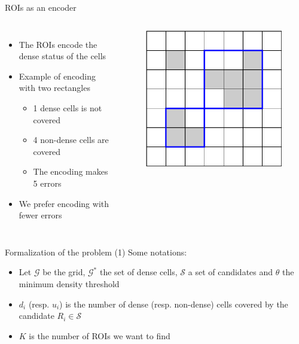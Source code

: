 \documentclass[10pt]{beamer}
\begin{document}
\begin{frame}{ROIs as an encoder}

\begin{columns}[T, onlytextwidth]
    \begin{itemize}
        \item The ROIs encode the dense status of the cells
        \item Example of encoding with two rectangles
        \begin{itemize}
            \item 1 dense cells is not covered
            \item 4 non-dense cells are covered
            \item The encoding makes 5 errors
        \end{itemize}
        \item We prefer encoding with fewer errors
    \end{itemize}
    
    \begin{figure}
        \centering
        \includegraphics[scale=0.5]{figures/running-example/ILP/running-ex-ilp1.pdf}
    \end{figure}
\end{columns}

\end{frame}

\begin{frame}{Formalization of the problem (1)}
Some notations:
    \begin{itemize}
        \item Let $\mathcal{G}$ be the grid, $\mathcal{G}^*$ the set of dense cells, $\mathcal{S}$ a set of candidates and $\theta$ the minimum density threshold
        \item $d_i$ (resp. $u_i$) is the number of dense (resp. non-dense) cells covered by the candidate $R_i \in \mathcal{S}$
        \item $K$ is the number of ROIs we want to find
    \end{itemize}
\end{frame}
\end{document}
